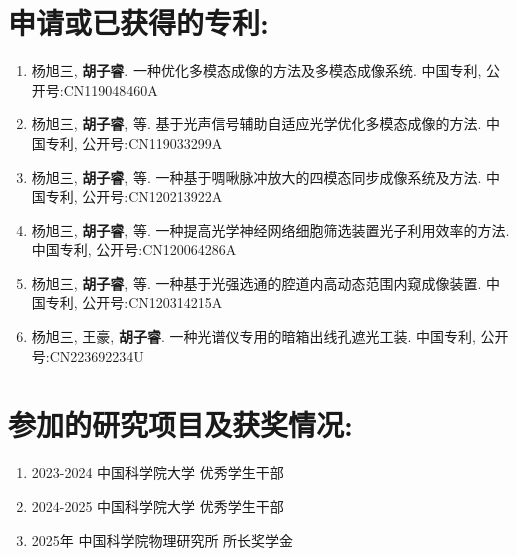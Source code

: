 \section*{申请或已获得的专利:}
\begin{enumerate}[nosep]
    \item 杨旭三, \textbf{胡子睿}. 一种优化多模态成像的方法及多模态成像系统. 中国专利, 公开号:CN119048460A
    \item 杨旭三, \textbf{胡子睿}, 等. 基于光声信号辅助自适应光学优化多模态成像的方法. 中国专利, 公开号:CN119033299A
    \item 杨旭三, \textbf{胡子睿}, 等. 一种基于啁啾脉冲放大的四模态同步成像系统及方法. 中国专利, 公开号:CN120213922A
    \item 杨旭三, \textbf{胡子睿}, 等. 一种提高光学神经网络细胞筛选装置光子利用效率的方法. 中国专利, 公开号:CN120064286A
    \item 杨旭三, \textbf{胡子睿}, 等. 一种基于光强选通的腔道内高动态范围内窥成像装置. 中国专利, 公开号:CN120314215A
    \item 杨旭三, 王豪, \textbf{胡子睿}. 一种光谱仪专用的暗箱出线孔遮光工装. 中国专利, 公开号:CN223692234U
\end{enumerate}

\section*{参加的研究项目及获奖情况:}
\begin{enumerate}[nosep]
    \item 2023-2024 中国科学院大学 优秀学生干部
    \item 2024-2025 中国科学院大学 优秀学生干部
    \item 2025年 中国科学院物理研究所 所长奖学金
\end{enumerate}


\cleardoublepage[plain]%
